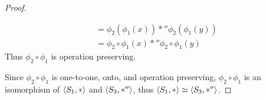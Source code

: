 \documentclass{article}
\begin{document}
\begin{enumerate}
{\begin{proof}
\begin{enumerate}[1.]
\begin{align*}
                                                   & = \phi_2(\phi_1(x)) *'' \phi_2(\phi_1(y))         \\
                                                   & = \phi_2 \circ \phi_1(x)*''\phi_2 \circ \phi_1(y)
                      \end{align*}
                      Thus $\phi_2 \circ \phi_1$ is operation preserving.
            \end{enumerate}
            Since $\phi_2 \circ \phi_1$ is one-to-one, onto, and operation preserving, $\phi_2 \circ \phi_1$ is an isomorphism of $\langle S_1,* \rangle$ and $\langle S_3,*'' \rangle$, thus $\langle S_1,* \rangle \simeq \langle S_3,*'' \rangle$.
        \end{proof}
    }
\end{enumerate}
\end{document}
